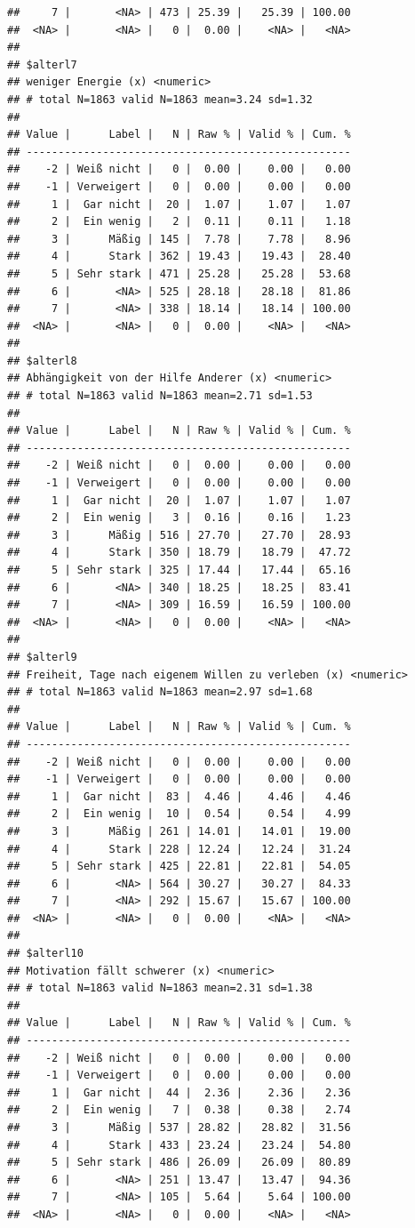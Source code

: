 \documentclass[
  doc]{apa6}
\begin{document}
\begin{verbatim}
##     7 |       <NA> | 473 | 25.39 |   25.39 | 100.00
##  <NA> |       <NA> |   0 |  0.00 |    <NA> |   <NA>
## 
## $alterl7
## weniger Energie (x) <numeric> 
## # total N=1863 valid N=1863 mean=3.24 sd=1.32
## 
## Value |      Label |   N | Raw % | Valid % | Cum. %
## ---------------------------------------------------
##    -2 | Weiß nicht |   0 |  0.00 |    0.00 |   0.00
##    -1 | Verweigert |   0 |  0.00 |    0.00 |   0.00
##     1 |  Gar nicht |  20 |  1.07 |    1.07 |   1.07
##     2 |  Ein wenig |   2 |  0.11 |    0.11 |   1.18
##     3 |      Mäßig | 145 |  7.78 |    7.78 |   8.96
##     4 |      Stark | 362 | 19.43 |   19.43 |  28.40
##     5 | Sehr stark | 471 | 25.28 |   25.28 |  53.68
##     6 |       <NA> | 525 | 28.18 |   28.18 |  81.86
##     7 |       <NA> | 338 | 18.14 |   18.14 | 100.00
##  <NA> |       <NA> |   0 |  0.00 |    <NA> |   <NA>
## 
## $alterl8
## Abhängigkeit von der Hilfe Anderer (x) <numeric> 
## # total N=1863 valid N=1863 mean=2.71 sd=1.53
## 
## Value |      Label |   N | Raw % | Valid % | Cum. %
## ---------------------------------------------------
##    -2 | Weiß nicht |   0 |  0.00 |    0.00 |   0.00
##    -1 | Verweigert |   0 |  0.00 |    0.00 |   0.00
##     1 |  Gar nicht |  20 |  1.07 |    1.07 |   1.07
##     2 |  Ein wenig |   3 |  0.16 |    0.16 |   1.23
##     3 |      Mäßig | 516 | 27.70 |   27.70 |  28.93
##     4 |      Stark | 350 | 18.79 |   18.79 |  47.72
##     5 | Sehr stark | 325 | 17.44 |   17.44 |  65.16
##     6 |       <NA> | 340 | 18.25 |   18.25 |  83.41
##     7 |       <NA> | 309 | 16.59 |   16.59 | 100.00
##  <NA> |       <NA> |   0 |  0.00 |    <NA> |   <NA>
## 
## $alterl9
## Freiheit, Tage nach eigenem Willen zu verleben (x) <numeric> 
## # total N=1863 valid N=1863 mean=2.97 sd=1.68
## 
## Value |      Label |   N | Raw % | Valid % | Cum. %
## ---------------------------------------------------
##    -2 | Weiß nicht |   0 |  0.00 |    0.00 |   0.00
##    -1 | Verweigert |   0 |  0.00 |    0.00 |   0.00
##     1 |  Gar nicht |  83 |  4.46 |    4.46 |   4.46
##     2 |  Ein wenig |  10 |  0.54 |    0.54 |   4.99
##     3 |      Mäßig | 261 | 14.01 |   14.01 |  19.00
##     4 |      Stark | 228 | 12.24 |   12.24 |  31.24
##     5 | Sehr stark | 425 | 22.81 |   22.81 |  54.05
##     6 |       <NA> | 564 | 30.27 |   30.27 |  84.33
##     7 |       <NA> | 292 | 15.67 |   15.67 | 100.00
##  <NA> |       <NA> |   0 |  0.00 |    <NA> |   <NA>
## 
## $alterl10
## Motivation fällt schwerer (x) <numeric> 
## # total N=1863 valid N=1863 mean=2.31 sd=1.38
## 
## Value |      Label |   N | Raw % | Valid % | Cum. %
## ---------------------------------------------------
##    -2 | Weiß nicht |   0 |  0.00 |    0.00 |   0.00
##    -1 | Verweigert |   0 |  0.00 |    0.00 |   0.00
##     1 |  Gar nicht |  44 |  2.36 |    2.36 |   2.36
##     2 |  Ein wenig |   7 |  0.38 |    0.38 |   2.74
##     3 |      Mäßig | 537 | 28.82 |   28.82 |  31.56
##     4 |      Stark | 433 | 23.24 |   23.24 |  54.80
##     5 | Sehr stark | 486 | 26.09 |   26.09 |  80.89
##     6 |       <NA> | 251 | 13.47 |   13.47 |  94.36
##     7 |       <NA> | 105 |  5.64 |    5.64 | 100.00
##  <NA> |       <NA> |   0 |  0.00 |    <NA> |   <NA>
\end{verbatim}
\end{document}

